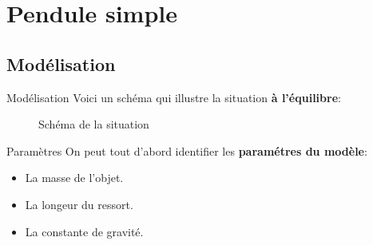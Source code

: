 \documentclass{beamer}
\begin{document}
    \section{Pendule simple}
        \subsection{Modélisation}
            \begin{frame}{Modélisation}
                Voici un schéma qui illustre la situation \textbf{à l'équilibre}:
                \begin{figure}
                    \centering
                    \caption{Schéma de la situation}
                \end{figure}
            \end{frame}
            \begin{frame}{Paramètres}
                On peut tout d'abord identifier les \textbf{paramétres du modèle}:
                \begin{itemize}
                \item La masse de l'objet.
                \item La longeur du ressort.
                \item La constante de gravité.
                \end{itemize}        
            \end{frame}
\end{document}
